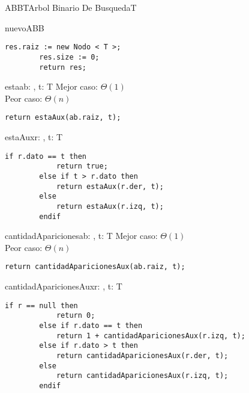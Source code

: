 \begin{module}{ABB}{T}{Arbol Binario De Busqueda}{T}



	\begin{proc}{nuevoABB}{}{\moduletype}
		\begin{lstlisting}[numbers=none,frame=none]
		res.raiz := new Nodo < T >;
		res.size := 0;
		return res;
		\end{lstlisting}
	\end{proc}

	\begin{proc}{esta}{\In ab: \moduletype, \In t: T}{\bool}
		Mejor caso: $\Theta(1)$\\
		Peor caso: $\Theta(n)$
		\begin{lstlisting}[numbers=none,frame=none]
		return estaAux(ab.raiz, t);
		\end{lstlisting}
	\end{proc}

	\begin{proc}{estaAux}{\In r: \nodo, \In t: T}{\bool}
		\begin{lstlisting}[numbers=none,frame=none]
		if r.dato == t then
			return true;
		else if t > r.dato then
			return estaAux(r.der, t);
		else
			return estaAux(r.izq, t);
		endif
		\end{lstlisting}
	\end{proc}

	\begin{proc}{cantidadApariciones}{\In ab: \moduletype, \In t: T}{\Int}
		Mejor caso: $\Theta(1)$ \\
		Peor caso: $\Theta(n)$
		\begin{lstlisting}[numbers=none,frame=none]
		return cantidadAparicionesAux(ab.raiz, t);
		\end{lstlisting}
	\end{proc}

	\begin{proc}{cantidadAparicionesAux}{\In r: \nodo, \In t: T}{\Int}
		\begin{lstlisting}[numbers=none,frame=none]
		if r == null then
			return 0;
		else if r.dato == t then
			return 1 + cantidadAparicionesAux(r.izq, t);
		else if r.dato > t then
			return cantidadAparicionesAux(r.der, t);
		else
			return cantidadAparicionesAux(r.izq, t);
		endif
		\end{lstlisting}
	\end{proc}


\end{module}
